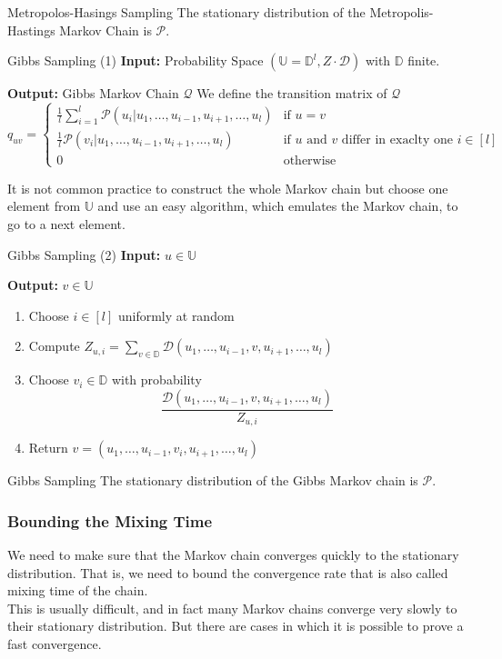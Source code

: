 \documentclass{panikzettel}
\begin{document}
\begin{theo}{Metropolos-Hasings Sampling}
The stationary distribution of the Metropolis-Hastings Markov Chain is $\mathcal{P}$.
\end{theo}

\begin{algo}{Gibbs Sampling (1)}
\textbf{Input:} Probability Space $(\mathbb{U} = \mathbb{D}^l, Z \cdot \mathcal{D})$ with $\mathbb{D}$ finite.

\textbf{Output:} Gibbs Markov Chain $\mathcal{Q}$
\tcblower
We define the transition matrix of $\mathcal{Q}$
$$
q_{uv} =
\begin{cases}
\frac{1}{l} \sum_{i=1}^l \mathcal{P}(u_i| u_1, \ldots, u_{i-1}, u_{i+1}, \ldots, u_l) & \text{if } u = v \\
\frac{1}{l} \mathcal{P}(v_i| u_1, \ldots, u_{i-1}, u_{i+1}, \ldots, u_l) & \text{if $u$ and $v$ differ in exaclty one } i \in [l] \\
0 & \text{otherwise}
\end{cases}
$$
\end{algo}

It is not common practice to construct the whole Markov chain but choose one element from $\mathbb{U}$ and use an easy algorithm, which emulates the Markov chain, to go to a next element.

\begin{algo}{Gibbs Sampling (2)}
\textbf{Input:} $u \in \mathbb{U}$

\textbf{Output:} $v \in \mathbb{U}$
\tcblower
\begin{enumerate}
    \item Choose $i \in [l]$ uniformly at random
    \item Compute $Z_{u,i} = \sum_{v \in \mathbb{D}} \mathcal{D}(u_1, \ldots, u_{i-1}, v, u_{i+1}, \ldots, u_l)$
    \item Choose $v_i \in \mathbb{D}$ with probability
$$
\frac{\mathcal{D}(u_1, \ldots, u_{i-1}, v, u_{i+1}, \ldots, u_l)}{Z_{u,i}}
$$
    \item Return $v = (u_1, \ldots, u_{i-1}, v_i, u_{i+1}, \ldots, u_l)$
\end{enumerate}
\end{algo}

\begin{theo}{Gibbs Sampling}
The stationary distribution of the Gibbs Markov chain is $\mathcal{P}$.
\end{theo}

\subsubsection{Bounding the Mixing Time}
We need to make sure that the Markov chain converges quickly to the stationary distribution.
That is, we need to bound the convergence rate that is also called mixing time of the chain.\\
This is usually difficult, and in fact many Markov chains converge very slowly to their stationary distribution. But there are cases in which it is possible to prove a fast convergence.
\end{document}

